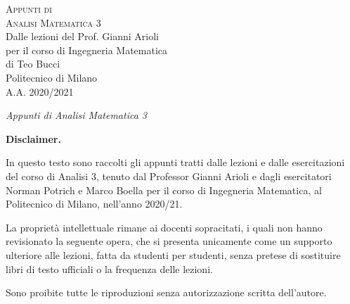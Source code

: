 \documentclass[10pt,a4paper,twoside]{book}
\begin{document}

\frontmatter
\pagestyle{empty} %
\vspace*{\fill}
\begin{center}
	{\large \textsc{Appunti di}}\\
	\vspace*{0.4cm}
	{\Huge \textsc{Analisi Matematica 3}}\\
	\vspace*{1cm}
	{\large {Dalle lezioni del Prof. Gianni Arioli}}\\
	\vspace*{0.1cm}
	{\large per il corso di Ingegneria Matematica}\\
	\vspace*{0.4cm}
	{\large {di Teo Bucci}}\\
	\vspace*{1cm}
	Politecnico di Milano\\A.A. 2020/2021
\end{center}
\vspace*{\fill}
\newpage


{\Large \textit{Appunti di Analisi Matematica 3}}

\vspace*{\fill}

\textbf{Disclaimer.}

In questo testo sono raccolti gli appunti tratti dalle lezioni e dalle esercitazioni del corso di Analisi 3, tenuto dal Professor Gianni Arioli e dagli esercitatori Norman Potrich e Marco Boella per il corso di Ingegneria Matematica, al Politecnico di Milano, nell'anno 2020/21.

La proprietà intellettuale rimane ai docenti sopracitati, i quali non hanno revisionato la seguente opera, che si presenta unicamente come un supporto ulteriore alle lezioni, fatta da studenti per studenti, senza pretese di sostituire libri di testo ufficiali o la frequenza delle lezioni.

\vspace*{1cm}


Sono proibite tutte le riproduzioni senza autorizzazione scritta dell'autore.
\end{document}
